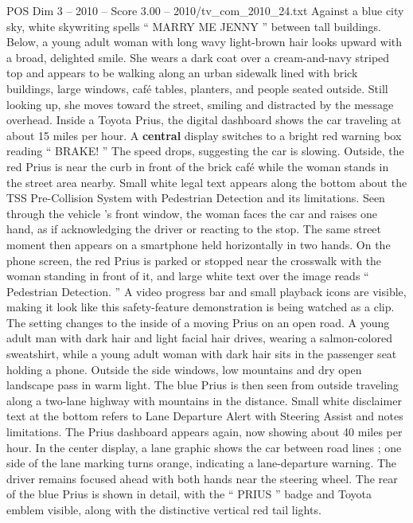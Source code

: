 \begin{textsample}{POS Dim 3 – 2010 – Score 3.00 – 2010/tv\_com\_2010\_24.txt}  \label{ex:f3_pos_085}
Against a blue city sky, white skywriting spells “ MARRY ME JENNY ” between tall buildings.
Below, a young adult woman with long wavy light-brown hair looks upward with a broad, delighted smile.
She wears a dark coat over a cream-and-navy striped top and appears to be walking along an urban sidewalk lined with brick buildings, large windows, café tables, planters, and people seated outside.
Still looking up, she moves toward the street, smiling and distracted by the message overhead.
Inside a Toyota Prius, the digital dashboard shows the car traveling at about 15 miles per hour.
A \textbf{central} display switches to a bright red warning box reading “ BRAKE! ” The speed drops, suggesting the car is slowing.
Outside, the red Prius is near the curb in front of the brick café while the woman stands in the street area nearby.
Small white legal text appears along the bottom about the TSS Pre-Collision System with Pedestrian Detection and its limitations.
Seen through the vehicle ’s front window, the woman faces the car and raises one hand, as if acknowledging the driver or reacting to the stop.
The same street moment then appears on a smartphone held horizontally in two hands.
On the phone screen, the red Prius is parked or stopped near the crosswalk with the woman standing in front of it, and large white text over the image reads “ Pedestrian Detection. ” A video progress bar and small playback icons are visible, making it look like this safety-feature demonstration is being watched as a clip.
The setting changes to the inside of a moving Prius on an open road.
A young adult man with dark hair and light facial hair drives, wearing a salmon-colored sweatshirt, while a young adult woman with dark hair sits in the passenger seat holding a phone.
Outside the side windows, low mountains and dry open landscape pass in warm light.
The blue Prius is then seen from outside traveling along a two-lane highway with mountains in the distance.
Small white disclaimer text at the bottom refers to Lane Departure Alert with Steering Assist and notes limitations.
The Prius dashboard appears again, now showing about 40 miles per hour.
In the center display, a lane graphic shows the car between road lines ; one side of the lane marking turns orange, indicating a lane-departure warning.
The driver remains focused ahead with both hands near the steering wheel.
The rear of the blue Prius is shown in detail, with the “ PRIUS ” badge and Toyota emblem visible, along with the distinctive vertical red tail lights.

\end{textsample}
